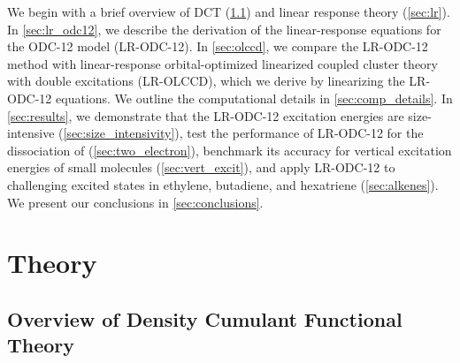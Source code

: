 We begin with a brief overview of DCT (\cref{sec:dct}) and linear response
theory (\cref{sec:lr}).
In \cref{sec:lr_odc12}, we describe the derivation of the linear-response
equations for the ODC-12 model (LR-ODC-12).
In \cref{sec:olccd}, we compare the LR-ODC-12 method with linear-response
orbital-optimized linearized coupled cluster theory with double excitations
(LR-OLCCD), which we derive by linearizing the LR-ODC-12 equations.
We outline the
computational details in \cref{sec:comp_details}.
In \cref{sec:results}, we demonstrate that the LR-ODC-12 excitation
energies are size-intensive (\cref{sec:size_intensivity}), test the performance
of LR-ODC-12 for the dissociation of  (\cref{sec:two_electron}),
benchmark its accuracy for vertical
excitation energies of small molecules (\cref{sec:vert_excit}), and apply LR-ODC-12 to challenging excited states in ethylene, butadiene, and hexatriene (\cref{sec:alkenes}).
We present our conclusions in \cref{sec:conclusions}. 

\section{Theory}

\subsection{Overview of Density Cumulant Functional Theory}
\label{sec:dct}

